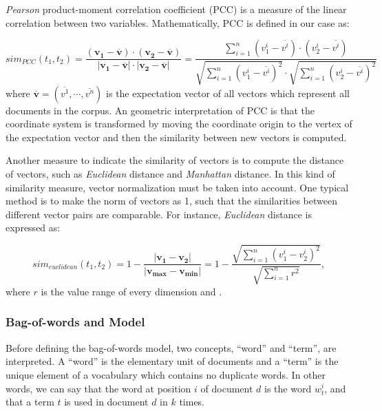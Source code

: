 \textit{Pearson} product-moment correlation coefficient (PCC) is a measure of the linear correlation between two variables. Mathematically, PCC is defined in our case as: 

\begin{equation}
    sim_{PCC}(t_1, t_2) = \frac{(\mathbf{v_1-\overline{v}}) \cdot (\mathbf{v_2-\overline{v}})}{|\mathbf{v_1-\overline{v}}| \cdot |\mathbf{v_2}-\mathbf{\overline{v}}|} = \frac{\sum_{i=1}^n (v_1^i-\overline{v^i}) \cdot (v_2^i-\overline{v^i})}{\sqrt{\sum_{i=1}^n (v_1^i-\overline{v^i})^2} \cdot \sqrt{\sum_{i=1}^n (v_2^i-\overline{v^i})^2}}
\end{equation}
where $\mathbf{\overline{v}}=(\overline{v^1}, \cdots, \overline{v^n})$ is the expectation vector of all vectors which represent all documents in the corpus. An geometric interpretation of PCC is that the coordinate system is transformed by moving the coordinate origin to the vertex of the expectation vector and then the similarity between new vectors is computed. 

Another measure to indicate the similarity of vectors is to compute the distance of vectors, such as \textit{Euclidean} distance and \textit{Manhattan} distance. In this kind of similarity measure, vector normalization must be taken into account. One typical method is to make the norm of vectors as 1, such that the similarities between different vector pairs are comparable. For instance, \textit{Euclidean} distance is expressed as: 

\begin{equation}
    sim_{euclidean}(t_1, t_2) = 1 - \frac{|\mathbf{v_1 - v_2}|}{|\mathbf{v_{max} - v_{min}}|} = 1 - \frac{\sqrt{\sum_{i=1}^n (v_1^i-v_2^i)^2}}{\sqrt{\sum_{i=1}^n r^2}} ,
\end{equation}
where $r$ is the value range of every dimension and . 

\subsubsection{Bag-of-words and \tfidf{} Model}

Before defining the bag-of-words model, two concepts, ``word'' and ``term'', are interpreted. A ``word'' is the elementary unit of documents and a ``term'' is the unique element of a vocabulary which contains no duplicate words. 
In other words, we can say that the word at position $i$ of document $d$ is the word $w_t^i$, and that a term $t$ is used in document $d$ in $k$ times. 

